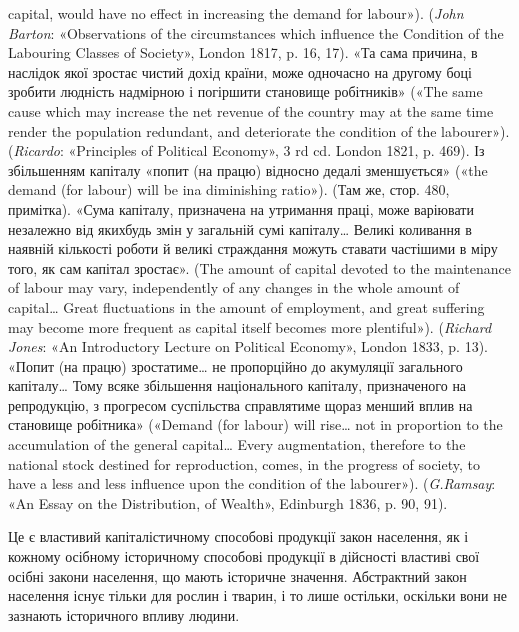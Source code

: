 {capital, would have no effect in increasing the demand for labour»). (\emph{John Barton}: «Observations of the circumstances which influence the Condition
of the Labouring Classes of Society», London 1817, p. 16, 17). «Та
сама причина, в наслідок якої зростає чистий дохід країни, може одночасно
на другому боці зробити людність надмірною і погіршити становище
робітників» («The same cause which may increase the net revenue of the country
may at the same time render the population redundant, and deteriorate
the condition of the labourer»). (\emph{Ricardo}: «Principles of Political Economy»,
3 rd cd. London 1821, p. 469). Із збільшенням капіталу «попит (на
працю) відносно дедалі зменшується» («the demand (for labour) will be ina diminishing
ratio»). (Там же, стор. 480, примітка). «Сума капіталу, призначена
на утримання праці, може варіювати незалежно від якихбудь змін
у загальній сумі капіталу\dots{} Великі коливання в наявній кількості роботи
й великі страждання можуть ставати частішими в міру того, як сам капітал
зростає». (The amount of capital devoted to the maintenance of labour
may vary, independently of any changes in the whole amount of capital\dots{}
Great fluctuations in the amount of employment, and great suffering may
become more frequent as capital itself becomes more plentiful»). (\emph{Richard Jones}: «An Introductory Lecture on Political Economy», London 1833, p. 13).
«Попит (на працю) зростатиме\dots{} не пропорційно до акумуляції загального
капіталу\dots{} Тому всяке збільшення національного капіталу, призначеного
на репродукцію, з прогресом суспільства справлятиме щораз
менший вплив на становище робітника» («Demand (for labour) will rise\dots{}
not in proportion to the accumulation of the general capital\dots{} Every
augmentation, therefore to the national stock destined for reproduction,
comes, in the progress of society, to have a less and less influence upon the
condition of the labourer»). (\emph{G.Ramsay}: «An Essay on the Distribution,
of Wealth», Edinburgh 1836, p. 90, 91).

} Це є властивий капіталістичному
способові продукції закон населення, як і кожному осібному
історичному способові продукції в дійсності властиві свої осібні
закони населення, що мають історичне значення. Абстрактний
закон населення існує тільки для рослин і тварин, і то лише
остільки, оскільки вони не зазнають історичного впливу людини.


